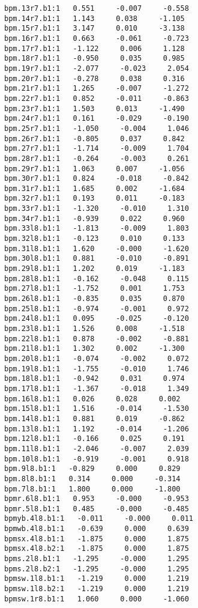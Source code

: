 \begin{verbatim}
bpm.13r7.b1:1   0.551     -0.007     -0.558
bpm.14r7.b1:1   1.143     0.038     -1.105
bpm.15r7.b1:1   3.147     0.010     -3.138
bpm.16r7.b1:1   0.663     -0.061     -0.723
bpm.17r7.b1:1   -1.122     0.006     1.128
bpm.18r7.b1:1   -0.950     0.035     0.985
bpm.19r7.b1:1   -2.077     -0.023     2.054
bpm.20r7.b1:1   -0.278     0.038     0.316
bpm.21r7.b1:1   1.265     -0.007     -1.272
bpm.22r7.b1:1   0.852     -0.011     -0.863
bpm.23r7.b1:1   1.503     0.013     -1.490
bpm.24r7.b1:1   0.161     -0.029     -0.190
bpm.25r7.b1:1   -1.050     -0.004     1.046
bpm.26r7.b1:1   -0.805     0.037     0.842
bpm.27r7.b1:1   -1.714     -0.009     1.704
bpm.28r7.b1:1   -0.264     -0.003     0.261
bpm.29r7.b1:1   1.063     0.007     -1.056
bpm.30r7.b1:1   0.824     -0.018     -0.842
bpm.31r7.b1:1   1.685     0.002     -1.684
bpm.32r7.b1:1   0.193     0.011     -0.183
bpm.33r7.b1:1   -1.320     -0.010     1.310
bpm.34r7.b1:1   -0.939     0.022     0.960
bpm.33l8.b1:1   -1.813     -0.009     1.803
bpm.32l8.b1:1   -0.123     0.010     0.133
bpm.31l8.b1:1   1.620     -0.000     -1.620
bpm.30l8.b1:1   0.881     -0.010     -0.891
bpm.29l8.b1:1   1.202     0.019     -1.183
bpm.28l8.b1:1   -0.162     -0.048     0.115
bpm.27l8.b1:1   -1.752     0.001     1.753
bpm.26l8.b1:1   -0.835     0.035     0.870
bpm.25l8.b1:1   -0.974     -0.001     0.972
bpm.24l8.b1:1   0.095     -0.025     -0.120
bpm.23l8.b1:1   1.526     0.008     -1.518
bpm.22l8.b1:1   0.878     -0.002     -0.881
bpm.21l8.b1:1   1.302     0.002     -1.300
bpm.20l8.b1:1   -0.074     -0.002     0.072
bpm.19l8.b1:1   -1.755     -0.010     1.746
bpm.18l8.b1:1   -0.942     0.031     0.974
bpm.17l8.b1:1   -1.367     -0.018     1.349
bpm.16l8.b1:1   0.026     0.028     0.002
bpm.15l8.b1:1   1.516     -0.014     -1.530
bpm.14l8.b1:1   0.881     0.019     -0.862
bpm.13l8.b1:1   1.192     -0.014     -1.206
bpm.12l8.b1:1   -0.166     0.025     0.191
bpm.11l8.b1:1   -2.046     -0.007     2.039
bpm.10l8.b1:1   -0.919     -0.001     0.918
bpm.9l8.b1:1   -0.829     0.000     0.829
bpm.8l8.b1:1   0.314     0.000     -0.314
bpm.7l8.b1:1   1.800     0.000     -1.800
bpmr.6l8.b1:1   0.953     -0.000     -0.953
bpmr.5l8.b1:1   0.485     -0.000     -0.485
bpmyb.4l8.b1:1   -0.011     -0.000     0.011
bpmwb.4l8.b1:1   -0.639     0.000     0.639
bpmsx.4l8.b1:1   -1.875     0.000     1.875
bpmsx.4l8.b2:1   -1.875     0.000     1.875
bpms.2l8.b1:1   -1.295     -0.000     1.295
bpms.2l8.b2:1   -1.295     -0.000     1.295
bpmsw.1l8.b1:1   -1.219     0.000     1.219
bpmsw.1l8.b2:1   -1.219     0.000     1.219
bpmsw.1r8.b1:1   1.060     0.000     -1.060

\end{verbatim}
